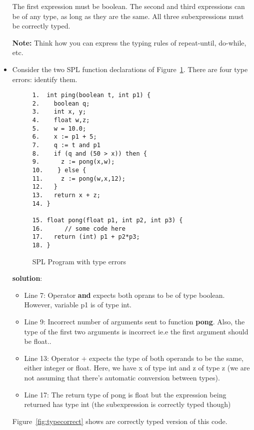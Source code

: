 \documentclass{article}
\begin{document}
\begin{itemize}
The first expression must be boolean. The second and third expressions can be of any type, as long as they are the same. All three subexpressions must be correctly typed.

\textbf{Note:} Think how you can express the typing rules of repeat-until, do-while, etc.

\item Consider the two SPL function declarations of Figure~\ref{fig:typeerror}. There are four type errors: identify them.

\begin{figure}
\begin{verbatim}
1.  int ping(boolean t, int p1) {
2.    boolean q;
3.    int x, y;
4.    float w,z;
5.    w = 10.0;
6.    x := p1 + 5;
7.    q := t and p1
8.    if (q and (50 > x)) then {
9.      z := pong(x,w);
10.    } else {
11.     z := pong(w,x,12); 
12.   }
13.   return x + z;
14. }
 
15. float pong(float p1, int p2, int p3) {
16.      // some code here
17.   return (int) p1 + p2*p3;
18. }
\end{verbatim}
\caption{SPL Program with type errors}\label{fig:typeerror}
\end{figure}

\textbf{solution}:
\begin{itemize}
\item Line 7: Operator \textbf{and} expects both oprans to be of type boolean. However, variable p1 is of type int. 
\item Line 9: Incorrect number of arguments sent to function \textbf{pong}. Also, the type of the first two arguments is incorrect ie.e the first argument should be float..
\item Line 13: Operator + expects the type of both operands to be the same, either integer or float. Here, we have x of type int and z of type z (we are not assuming that there's automatic conversion between types).
\item Line 17: The return type of pong is float but the expression being returned has type int (the subexpression is correctly typed though)
\end{itemize}

Figure~\ref{fig:typecorrect} shows are correctly typed version of this code.

\end{itemize}
\end{document}
